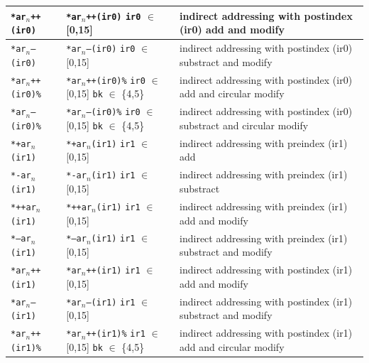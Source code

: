 \begin{table}[!p]
\begin{center}
\begin{tabular}{|p{2.3cm}|p{2.3cm}|p{11.0cm}|}
	\hline
	\texttt{*ar$_n$++(ir0)} & \texttt{*ar$_n$++(ir0)} \newline \texttt{ir0} $\in$ [0,15] & indirect addressing with postindex (ir0) add and modify\\
	\hline
	\texttt{*ar$_n$--(ir0)} & \texttt{*ar$_n$--(ir0)} \newline \texttt{ir0} $\in$ [0,15] & indirect addressing with postindex (ir0) substract and modify\\
	\hline
	\texttt{*ar$_n$++(ir0)\%} & \texttt{*ar$_n$++(ir0)\%} \newline \texttt{ir0} $\in$ [0,15] \newline \texttt{bk} $\in$ \{4,5\} & indirect addressing with postindex (ir0) add and circular modify\\
	\hline
	\texttt{*ar$_n$--(ir0)\%} & \texttt{*ar$_n$--(ir0)\%} \newline \texttt{ir0} $\in$ [0,15] \newline \texttt{bk} $\in$ \{4,5\} & indirect addressing with postindex (ir0) substract and circular modify\\
	\hline
	\texttt{*+ar$_n$(ir1)} & \texttt{*+ar$_n$(ir1)} \newline \texttt{ir1} $\in$ [0,15] & indirect addressing with preindex (ir1) add\\
	\hline
	\texttt{*-ar$_n$(ir1)} & \texttt{*-ar$_n$(ir1)} \newline \texttt{ir1} $\in$ [0,15] & indirect addressing with preindex (ir1) substract\\
	\hline
	\texttt{*++ar$_n$(ir1)} & \texttt{*++ar$_n$(ir1)} \newline \texttt{ir1} $\in$ [0,15] & indirect addressing with preindex (ir1) add and modify\\
	\hline
	\texttt{*--ar$_n$(ir1)} & \texttt{*--ar$_n$(ir1)} \newline \texttt{ir1} $\in$ [0,15] & indirect addressing with preindex (ir1) substract and modify\\
	\hline
	\texttt{*ar$_n$++(ir1)} & \texttt{*ar$_n$++(ir1)} \newline \texttt{ir1} $\in$ [0,15] & indirect addressing with postindex (ir1) add and modify\\
	\hline
	\texttt{*ar$_n$--(ir1)} & \texttt{*ar$_n$--(ir1)} \newline \texttt{ir1} $\in$ [0,15] & indirect addressing with postindex (ir1) substract and modify\\
	\hline
	\texttt{*ar$_n$++(ir1)\%} & \texttt{*ar$_n$++(ir1)\%} \newline \texttt{ir1} $\in$ [0,15] \newline \texttt{bk} $\in$ \{4,5\} & indirect addressing with postindex (ir1) add and circular modify\\

\end{tabular}
\end{center}
\end{table}
